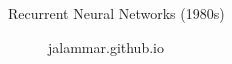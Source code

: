 \documentclass[10pt]{beamer}
\begin{document}
\begin{frame}[fragile]{Recurrent Neural Networks (1980s)}




	\begin{figure}[h]
		\centering
		\caption{jalammar.github.io}
	\end{figure}

\end{frame}
\end{document}
